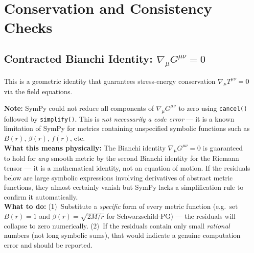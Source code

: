 \documentclass[11pt,a4paper]{article}
\begin{document}
\section{Conservation and Consistency Checks}
\subsection{Contracted Bianchi Identity: $\nabla_\mu G^{\mu\nu} = 0$}
This is a geometric identity that guarantees stress-energy conservation $\nabla_\mu T^{\mu\nu} = 0$ via the field equations.
\begin{tcolorbox}[colback=boxred,colframe=black!40,title=\textbf{Bianchi Identity --- Simplification Incomplete},breakable]
\textbf{Note:} SymPy could not reduce all components of $\nabla_\mu G^{\mu\nu}$ to zero using \texttt{cancel()} followed by \texttt{simplify()}. This is \emph{not necessarily a code error} --- it is a known limitation of SymPy for metrics containing unspecified symbolic functions such as $B(r)$, $\beta(r)$, $f(r)$, etc. \\[4pt]\textbf{What this means physically:} The Bianchi identity $\nabla_\mu G^{\mu\nu}=0$ is guaranteed to hold for \emph{any} smooth metric by the second Bianchi identity for the Riemann tensor --- it is a mathematical identity, not an equation of motion. If the residuals below are large symbolic expressions involving derivatives of abstract metric functions, they almost certainly vanish but SymPy lacks a simplification rule to confirm it automatically. \\[4pt]\textbf{What to do:} (1)~Substitute a \emph{specific} form of every metric function (e.g.\ set $B(r)=1$ and $\beta(r)=\sqrt{2M/r}$ for Schwarzschild-PG) --- the residuals will collapse to zero numerically. (2)~If the residuals contain only small \emph{rational} numbers (not long symbolic sums), that would indicate a genuine computation error and should be reported.
\end{tcolorbox}
\end{document}
